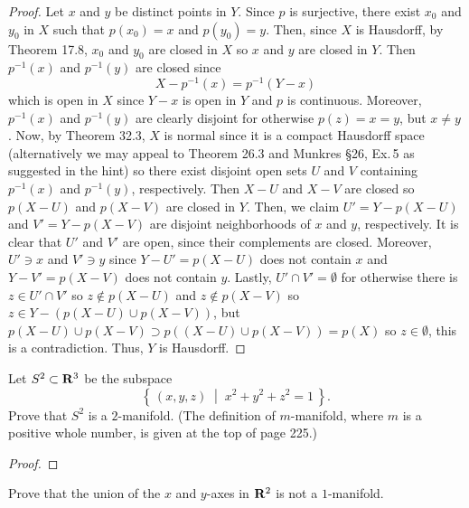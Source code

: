 \begin{proof}
Let $x$ and $y$ be distinct points in $Y$. Since $p$ is surjective, there
exist $x_0$ and $y_0$ in $X$ such that $p(x_0)=x$ and $p(y_0)=y$. Then,
since $X$ is Hausdorff, by Theorem 17.8, $x_0$ and $y_0$ are closed in $X$
so $x$ and $y$ are closed in $Y$. Then $p^{-1}(x)$ and $p^{-1}(y)$ are
closed since
\[
X-p^{-1}(x)=p^{-1}(Y-x)
\]
which is open in $X$ since $Y-x$ is open in $Y$ and $p$ is
continuous. Moreover, $p^{-1}(x)$ and $p^{-1}(y)$ are clearly disjoint for
otherwise $p(z)=x=y$, but $x\neq y$. Now, by Theorem 32.3, $X$ is normal
since it is a compact Hausdorff space (alternatively we may appeal to
Theorem 26.3 and Munkres \S 26, Ex.\,5 as suggested in the hint) so there
exist disjoint open sets $U$ and $V$ containing $p^{-1}(x)$ and
$p^{-1}(y)$, respectively. Then $X-U$ and $X-V$ are closed so $p(X-U)$ and
$p(X-V)$ are closed in $Y$. Then, we claim $U'=Y-p(X-U)$ and $V'=Y-p(X-V)$
are disjoint neighborhoods of $x$ and $y$, respectively. It is clear that
$U'$ and $V'$ are open, since their complements are closed. Moreover,
$U'\ni x$ and $V'\ni y$ since $Y-U'=p(X-U)$ does not contain $x$ and
$Y-V'=p(X-V)$ does not contain $y$. Lastly, $U'\cap V'=\emptyset$ for
otherwise there is $z\in U'\cap V'$ so $z\notin p(X-U)$ and $z\notin
p(X-V)$ so $z\in Y-(p(X-U)\cup p(X-V))$, but $p(X-U)\cup p(X-V)\supset
p((X-U)\cup p(X-V))=p(X)$ so $z\in\emptyset$, this is a
contradiction. Thus, $Y$ is Hausdorff.
\end{proof}
\newpage
\begin{problem}[(C)]
Let $S^2\subset\mathbf{R}^3$ be the subspace
\[
\left\{\,(x,y,z)\;\middle|\; x^2+y^2+z^2=1\,\right\}.
\]
Prove that $S^2$ is a $2$-manifold. (The definition of
$m$-manifold, where $m$ is a positive whole number, is given at
the top of page 225.)
\end{problem}
\begin{proof}

\end{proof}
\newpage
\begin{problem}[(D)]
Prove that the union of the $x$ and $y$-axes in $\mathbf{R}^2$ is not a
$1$-manifold.
\end{problem}
